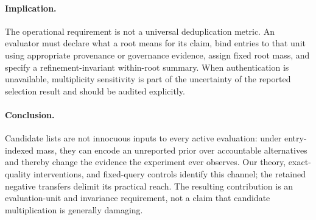 \paragraph{Implication.}
The operational requirement is not a universal deduplication metric. An evaluator must declare what a root means for its claim, bind entries to that unit using appropriate provenance or governance evidence, assign fixed root mass, and specify a refinement-invariant within-root summary. When authentication is unavailable, multiplicity sensitivity is part of the uncertainty of the reported selection result and should be audited explicitly.

\paragraph{Conclusion.}
Candidate lists are not innocuous inputs to every active evaluation: under entry-indexed mass, they can encode an unreported prior over accountable alternatives and thereby change the evidence the experiment ever observes. Our theory, exact-quality interventions, and fixed-query controls identify this channel; the retained negative transfers delimit its practical reach. The resulting contribution is an evaluation-unit and invariance requirement, not a claim that candidate multiplication is generally damaging.

